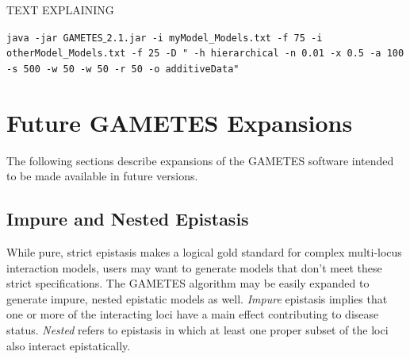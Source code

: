 \documentclass{report}
\begin{document}
TEXT EXPLAINING

\begin{center}
\texttt{java -jar GAMETES$\_$2.1.jar -i myModel\_Models.txt -f 75 -i otherModel\_Models.txt -f 25 -D " -h hierarchical -n 0.01 -x 0.5 -a 100 -s 500 -w 50 -w 50 -r 50 -o additiveData"}
\end{center}


\chapter{Future GAMETES Expansions} 
The following sections describe expansions of the GAMETES software intended to be made available in future versions.

\section{Impure and Nested Epistasis} 
While pure, strict epistasis makes a logical gold standard for complex multi-locus interaction models, users may want to generate models that don't meet these strict specifications.  The GAMETES algorithm may be easily expanded to generate impure, nested epistatic models as well.  \emph{Impure} epistasis implies that one or more of the interacting loci have a main effect contributing to disease status.  \emph{Nested} refers to epistasis in which at least one proper subset of the loci also interact epistatically.



\end{document}
